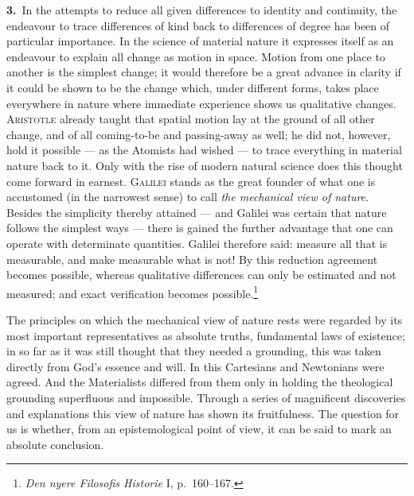 \documentclass[12pt,a4paper]{book}
\newcommand{\opage}[1]{\marginnote{\footnotesize\textit{[#1]}}}
\begin{document}
\noindent\textbf{\opage{39}3.}~In the attempts to reduce all given differences to identity
and continuity, the endeavour to trace differences of kind back to differences
of degree has been of particular importance. In the science of material nature
it expresses itself as an endeavour to explain all change as motion in space.
Motion from one place to another is the simplest change; it would therefore be a
great advance in clarity if it could be shown to be the change which, under
different forms, takes place everywhere in nature where immediate experience
shows us qualitative changes. \textsc{Aristotle} already taught that spatial
motion lay at the ground of all other change, and of all coming-to-be and
passing-away as well; he did not, however, hold it possible --- as the Atomists
had wished --- to trace everything in material nature back to it. Only with the
rise of modern natural science does this thought come forward in earnest.
\textsc{Galilei} stands as the great founder of what one is accustomed (in the
narrowest sense) to call \emph{the mechanical view of nature}. Besides the
simplicity thereby attained --- and Galilei was certain that nature follows the
simplest ways --- there is gained the further advantage that one can operate
with determinate quantities. Galilei therefore said: measure all that is
measurable, and make measurable what is not! By this reduction agreement becomes
possible, whereas qualitative differences can only be estimated and not
measured; and exact verification becomes possible.\footnote{\textit{Den nyere
Filosofis Historie} I, p.~160--167.}

The principles on which the mechanical view of nature rests were regarded by its
most important representatives as absolute truths, fundamental laws of
existence; in so far as it was still thought that they needed a grounding, this
was taken directly from God's essence and will. In this Cartesians and
Newtonians were agreed. And the Materialists differed from them only in holding
the theological grounding superfluous and impossible. Through a series of
magnificent discoveries and explanations this view of nature has shown its
fruitfulness. The question for us is whether, from an epistemological point of
view, it can be said to mark an absolute conclusion.
\end{document}

